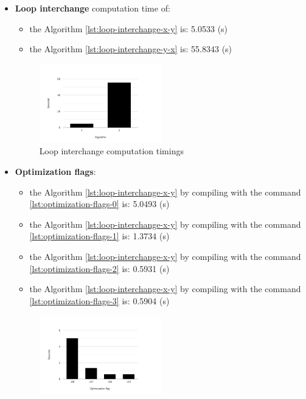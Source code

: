 \documentclass[conference]{IEEEtran}
\begin{document}
\begin{itemize}
	\item \textbf{Loop interchange} computation time of: 
	\begin{itemize}
		\item the Algorithm \ref{lst:loop-interchange-x-y} is: 5.0533 (s) 
		\item the Algorithm \ref{lst:loop-interchange-y-x} is: 55.8343 (s)
	\end{itemize}
	\begin{figure}[htbp]
		\centering
			\includegraphics[width=0.50\textwidth]{loop-interchange.png}
		\caption{Loop interchange computation timings}
		\label{fig:loop-interchange}
	\end{figure}
	\item \textbf{Optimization flags}:
	\begin{itemize}
		\item the Algorithm \ref{lst:loop-interchange-x-y} by compiling with the command \ref{lst:optimization-flags-0} is: 5.0493 (s)
		\item the Algorithm \ref{lst:loop-interchange-x-y} by compiling with the command \ref{lst:optimization-flags-1} is: 1.3734 (s)
		\item the Algorithm \ref{lst:loop-interchange-x-y} by compiling with the command \ref{lst:optimization-flags-2} is: 0.5931 (s)
		\item the Algorithm \ref{lst:loop-interchange-x-y} by compiling with the command \ref{lst:optimization-flags-3} is: 0.5904 (s)
	\end{itemize}
	\begin{figure}[htbp]
		\centering
			\includegraphics[width=0.50\textwidth]{optimization-flags.png}

\end{figure}
\end{itemize}
\end{document}
